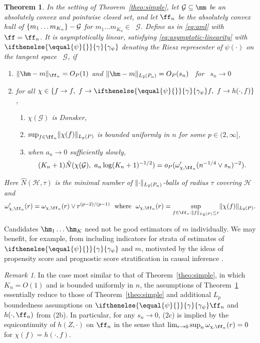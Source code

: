 \documentclass[aos,submission]{imsart}
\theoremstyle{plain}
\newtheorem{theo}[prop]{Theorem}
\theoremstyle{remark}
\newtheorem{rema}{Remark}
\DeclareMathOperator*{\cspan}{\overline{span}}
\newcommand{\riesz}[1][]{\ifthenelse{\equal{#1}{}}{\gamma}{\gamma_{{#1}}}}
\newcommand{\HH}{\mathcal{H}}
\DeclarePairedDelimiter\norm{\lVert}{\rVert}
\DeclarePairedDelimiter\set{\{}{\}}
\newcommand{\GG}{\mathcal{G}}
\begin{document}
\begin{theo}
\label{theo:simple-hull}
In the setting of Theorem~\ref{theo:simple},
let $\GG \subseteq \mm $ be an absolutely convex and pointwise closed set,
and let $\ff_n$ be the absolutely convex hull of $\set{m_1 \ldots m_{K_n}} - \GG$
for $m_1 \ldots m_{K_n} \in \cspan \GG$.
Define  as in \eqref{eq:aml} with $\ff =\ff_n$.
It is asymptotically linear, satisfying \eqref{eq:asymptotic-linearity} with $\riesz[\psi]$ denoting the Riesz representer of $\psi(\cdot)$ on the tangent space $\cspan\GG$, if
\begin{enumerate}
\item $\norm{\hm - m}_{\ff_n} = O_P(1)$ and $\norm{\hm - m}_{L_2(\Pn)} = O_P(s_n)$ \ for \ $s_n \to 0$ 
\item for all $\chi \in \set{ f \to f,\ f \to \riesz[\psi]f,\ f \to h(\cdot,f)}$,
\begin{enumerate}
\item $\chi(\GG)$ is Donsker, 
\item $\sup_{f \in \ff_n}\norm{\chi(f)}_{L_p(\P)}$ is bounded uniformly in $n$ for some $p \in (2,\infty]$, 
\item when $a_n \to 0$ sufficiently slowly,
\[ (K_n+1)\hat N(\chi(\GG),\ a_n \log(K_n+1)^{-1/2}) = o_P(\omega'_{\chi,\ff_n}(n^{-1/4} \vee s_n)^{-2}). \]
\end{enumerate}
\end{enumerate}
Here $\hat N(\HH, \tau)$ is the minimal number of $\norm{\cdot}_{L_2(\Pn)}$-balls of radius $\tau$ covering $\HH$ and
\[ \omega_{\chi,\ff_n}'(r) = \omega_{\chi,\ff_n}(r) \vee r^{(p-2)/(p-1)} \ \text{ where }\
 \omega_{\chi,\ff_n}(r) =\sup_{f \in \ff_n : \norm{f}_{L_2(\P)} \le r} \norm{\chi(f)}_{L_2(\P)}. \]

\end{theo}

Candidates $\hm_1 \ldots \hm_K$ need not be good estimators of $m$ individually. We may benefit, for example, 
from including indicators for strata of estimates of $\riesz[\psi]$ and $m$, motivated 
by the ideas of propensity score and prognostic score stratification in causal inference \citep{rosenbaum1984reducing}.


\begin{rema}
\label{rema:hull-k-constant}
In the case most similar to that of Theorem~\ref{theo:simple}, in which $K_n = O(1)$
and \smash{$\sup_{f \in \ff_n}\norm{f}_{\infty}$} is bounded uniformly in $n$, the assumptions of Theorem~\ref{theo:simple-hull} essentially 
reduce to those of Theorem~\ref{theo:simple} and additional $L_p$ boundedness assumptions on $\riesz[\psi]\ff_n$ and $h(\cdot,\ff_n)$
from (2b). In particular, for any $s_n \to 0$, (2c) is implied by the equicontinuity of $h(Z,\cdot)$ on $\ff_n$ in the sense that $\lim_{r \to 0}\sup_{n}\omega_{\chi,\ff_n}(r)=0$ for $\chi(f)=h(\cdot,f)$. 
\end{rema}
\end{document}
